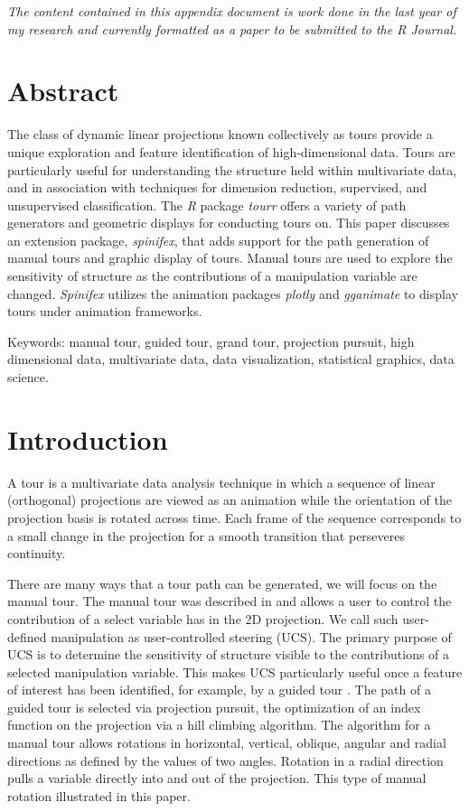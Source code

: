 \documentclass{monashthesis}
\begin{document}
\emph{The content contained in this appendix document is work done in
the last year of my research and currently formatted as a paper to be
submitted to the R Journal.}

\section{Abstract}\label{abstract-1}

The class of dynamic linear projections known collectively as tours
provide a unique exploration and feature identification of
high-dimensional data. Tours are particularly useful for understanding
the structure held within multivariate data, and in association with
techniques for dimension reduction, supervised, and unsupervised
classification. The \emph{R} package \emph{tourr} offers a variety of
path generators and geometric displays for conducting tours on. This
paper discusses an extension package, \emph{spinifex}, that adds support
for the path generation of manual tours and graphic display of tours.
Manual tours are used to explore the sensitivity of structure as the
contributions of a manipulation variable are changed. \emph{Spinifex}
utilizes the animation packages \emph{plotly} and \emph{gganimate} to
display tours under animation frameworks.

Keywords: manual tour, guided tour, grand tour, projection pursuit, high
dimensional data, multivariate data, data visualization, statistical
graphics, data science.

\section{Introduction}\label{introduction}

A tour is a multivariate data analysis technique in which a sequence of
linear (orthogonal) projections are viewed as an animation while the
orientation of the projection basis is rotated across time. Each frame
of the sequence corresponds to a small change in the projection for a
smooth transition that perseveres continuity.

There are many ways that a tour path can be generated, we will focus on
the manual tour. The manual tour was described in
\textcite{cook_manual_1997} and allows a user to control the
contribution of a select variable has in the 2D projection. We call such
user-defined manipulation as user-controlled steering (UCS). The primary
purpose of UCS is to determine the sensitivity of structure visible to
the contributions of a selected manipulation variable. This makes UCS
particularly useful once a feature of interest has been identified, for
example, by a guided tour \autocite{cook_grand_1995}. The path of a
guided tour is selected via projection pursuit, the optimization of an
index function on the projection via a hill climbing algorithm. The
algorithm for a manual tour allows rotations in horizontal, vertical,
oblique, angular and radial directions as defined by the values of two
angles. Rotation in a radial direction pulls a variable directly into
and out of the projection. This type of manual rotation illustrated in
this paper.
\end{document}
